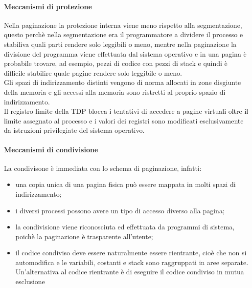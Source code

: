 \documentclass[12pt, letterpaper]{report}
\begin{document}
	\paragraph{Meccanismi di protezione}
	Nella paginazione la protezione interna viene meno rispetto alla segmentazione, questo perchè nella segmentazione era il programmatore a dividere il processo e stabiliva quali parti rendere solo leggibili o meno, mentre nella paginazione la divisione del programma viene effettuata dal sistema operativo e in una pagina è probabile trovare, ad esempio, pezzi di codice con pezzi di stack e quindi è difficile stabilire quale pagine rendere solo leggibile o meno. \\
	Gli spazi di indirizzamento distinti vengono di norma allocati in zone disgiunte della memoria e gli accessi alla memoria sono ristretti al proprio spazio di indirizzamento. \\
	Il registro limite della TDP blocca i tentativi di accedere a pagine virtuali oltre il limite assegnato al processo e i valori dei registri sono modificati esclusivamente da istruzioni privilegiate del sistema operativo.
	\paragraph{Meccanismi di condivisione}
	La condivisone è immediata con lo schema di paginazione, infatti:
	\begin{itemize}
		\item una copia unica di una pagina fisica può essere mappata in molti spazi di indirizzamento;
		\item i diversi processi possono avere un tipo di accesso diverso alla pagina;
		\item la condivisione viene riconosciuta ed effettuata da programmi di sistema, poichè la paginazione è trasparente all'utente;
		\item il codice condiviso deve essere naturalmente essere rientrante, cioè che non si automodifica e le variabili, costanti e stack sono raggruppati in aree separate. Un'alternativa al codice rientrante è di eseguire il codice condiviso in mutua esclusione
	\end{itemize}
\end{document}
